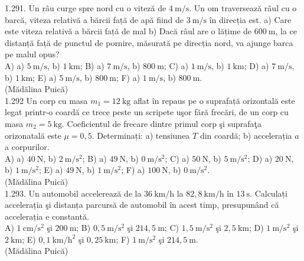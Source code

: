 {%
1.291. Un râu curge spre nord cu o viteză de $4 \mathrm{~m} / \mathrm{s}$. Un om traversează râul cu o barcă, viteza relativă a bărcii față de apă fiind de $3 \mathrm{~m} / \mathrm{s}$ în direcția est. a) Care este viteza relativă a bărcii față de mal b) Dacă râul are o lățime de $600 \mathrm{~m}$, la ce distanță față de punctul de pornire, măsurată pe direcția nord, va ajunge barca pe malul opus?\\ A) a) $5 \mathrm{~m} / \mathrm{s}$, b) $1 \mathrm{~km}$; B) a) $7 \mathrm{~m} / \mathrm{s}$, b) $800 \mathrm{~m}$; C) a) $1 \mathrm{~m} / \mathrm{s}$, b) $1 \mathrm{~km}$; D) a) $7 \mathrm{~m} / \mathrm{s}$, b) $1 \mathrm{~km}$; E) a) $5 \mathrm{~m} / \mathrm{s}$, b) $800 \mathrm{~m}$; F) a) $1 \mathrm{~m} / \mathrm{s}$, b) $800 \mathrm{~m}$.\\ (Mădălina Puică)\\

1.292 Un corp cu masa $m_{1}=12 \mathrm{~kg}$ aflat în repaus pe o suprafață orizontală este legat printr-o coardă ce trece peste un scripete uşor fără frecări, de un corp cu masa $m_{2}=5 \mathrm{~kg}$. Coeficientul de frecare dintre primul corp şi suprafaţa orizonatală este $\mu=0,5$. Determinați: a) tensiunea $T$ din coardă; b) accelerația $a$ a corpurilor.\\ A) a) $40 \mathrm{~N}$, b) $2 \mathrm{~m} / \mathrm{s}^{2}$; B) a) $49 \mathrm{~N}$, b) $0 \mathrm{~m} / \mathrm{s}^{2}$; C) a) $50 \mathrm{~N}$, b) $5 \mathrm{~m} / \mathrm{s}^{2}$; D) a) $20 \mathrm{~N}$, b) $1 \mathrm{~m} / \mathrm{s}^{2}$; E) a) $49 \mathrm{~N}$, b) $1 \mathrm{~m} / \mathrm{s}^{2}$; F) a) $100 \mathrm{~N}$, b) $0 \mathrm{~m} / \mathrm{s}^{2}$.\\ (Mădălina Puică)\\

1.293. Un automobil accelerează de la $36 \mathrm{~km} / \mathrm{h}$ la $82,8 \mathrm{~km} / \mathrm{h}$ în $13 \mathrm{~s}$. Calculați accelerația şi distanța parcursă de automobil în acest timp, presupunând că accelerația e constantă.\\ A) $1 \mathrm{~cm} / \mathrm{s}^{2}$ şi $200 \mathrm{~m}$; B) $0,5 \mathrm{~m} / \mathrm{s}^{2}$ şi $214,5 \mathrm{~m}$; C) $1,5 \mathrm{~m} / \mathrm{s}^{2}$ şi $2,5 \mathrm{~km}$; D) $1 \mathrm{~m} / \mathrm{s}^{2}$ şi $2 \mathrm{~km}$; E) $0,1 \mathrm{~km} / \mathrm{h}^{2}$ şi $0,25 \mathrm{~km}$; F) $1 \mathrm{~m} / \mathrm{s}^{2}$ şi $214,5 \mathrm{~m}$.\\ (Mădălina Puică)\\

}
